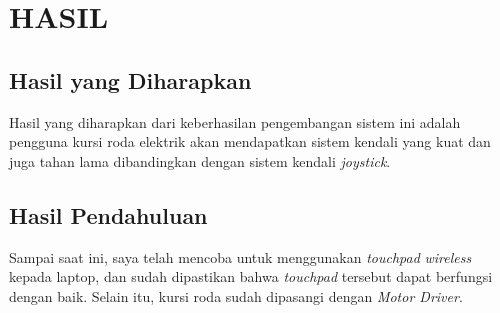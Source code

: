 \chapter{HASIL}

\section{Hasil yang Diharapkan}

Hasil yang diharapkan dari keberhasilan pengembangan sistem ini adalah pengguna kursi roda elektrik akan mendapatkan sistem kendali yang kuat dan juga tahan lama dibandingkan dengan sistem kendali \textit{joystick}.

\section{Hasil Pendahuluan}

Sampai saat ini, saya telah mencoba untuk menggunakan \textit{touchpad} \textit{wireless} kepada laptop, dan sudah dipastikan bahwa \textit{touchpad} tersebut dapat berfungsi dengan baik. Selain itu, kursi roda sudah dipasangi dengan \textit{Motor Driver}. 
